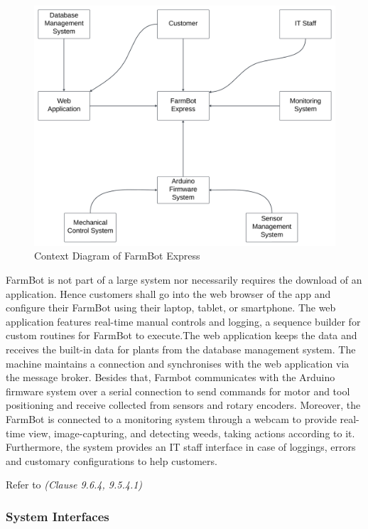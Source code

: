 \begin{figure}[h!]
  \includegraphics[width=\linewidth]{Figures/context-diagram.png}
  \caption{Context Diagram of FarmBot Express}
\end{figure}

\newpage

FarmBot is not part of a large system nor necessarily requires the download of an application. Hence customers shall go into the web browser of the app and configure their FarmBot using their laptop, tablet, or smartphone.
The web application features real-time manual controls and logging, a sequence builder for custom routines for FarmBot to execute.The web application keeps the data and receives the built-in data for plants from the database management system. The machine maintains a connection and synchronises with the web application via the message broker. Besides that, Farmbot communicates with the Arduino firmware system over a serial connection to send commands for motor and tool positioning and receive collected from sensors and rotary encoders. Moreover, the FarmBot is connected to a monitoring system through a webcam to provide real-time view, image-capturing, and detecting weeds, taking actions according to it. Furthermore, the system provides an IT staff interface in case of loggings, errors and customary configurations to help customers.


Refer to \textit{(Clause 9.6.4, 9.5.4.1)}
\subsubsection{System Interfaces}

